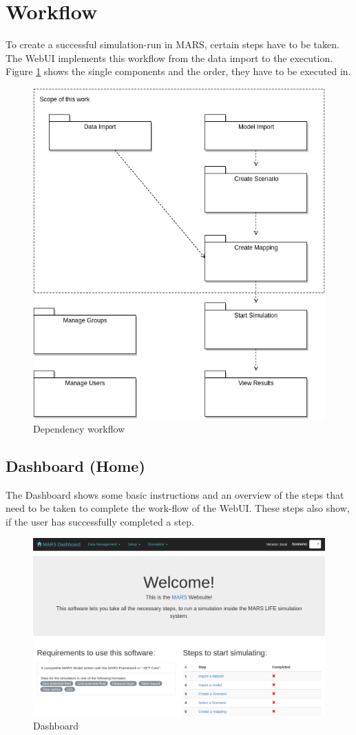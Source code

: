 \section{Workflow}
\label{sec:workflow}
To create a successful simulation-run in MARS, certain steps have to be taken. The WebUI implements this workflow from the data import to the execution. Figure \ref{fig:dependency-workflow} shows the single components and the order, they have to be executed in.
\begin{figure}[H]
	\centering\includegraphics[width=.7\textwidth]{res/Dependency-workflow}
	\caption{Dependency workflow}
	\label{fig:dependency-workflow}
\end{figure}


\subsection{Dashboard (Home)}
The Dashboard shows some basic instructions and an overview of the steps that need to be taken to complete the work-flow of the WebUI. These steps also show, if the user has successfully completed a step.
\begin{figure}[H]
	\centering\includegraphics[width=1\textwidth]{res/workflow_dashboard}
	\caption{Dashboard}
	\label{fig:dashboard-ui}
\end{figure}


